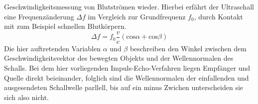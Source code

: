 Geschwindigkeitsmessung von Blutströmen wieder. Hierbei erfährt der Ultraschall eine Frequenzänderung $\Delta f$ im Vergleich zur Grundfrequenz $f_0$,
durch Kontakt mit zum Beispiel schnellen Blutkörpern. 
\begin{equation}
    \label{eqn:deltaf}
    \Delta f = f_0 \frac{v}{c} \left ( \text{cos}\alpha + \text{cos}\beta \right )
\end{equation}
Die hier auftretenden Variablen $\alpha$ und $\beta$ beschreiben den Winkel zwischen dem Geschwindigkeitsvektor des bewegten Objekts
und der Wellennormalen des Schalls. Bei dem hier vorliegenden Impuls-Echo-Verfahren liegen Empfänger und Quelle direkt beieinander, folglich sind 
die Wellennormalen der einfallenden und ausgesendeten Schallwelle parllell, bis auf ein minus Zwichen unterscheiden sie sich also nicht.  
